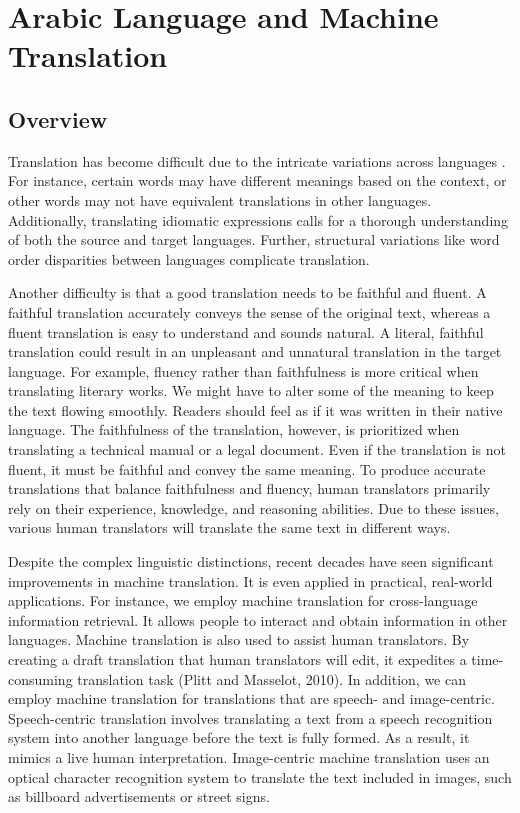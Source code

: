 \chapter{Arabic Language and Machine Translation}
\pagestyle{fancy}
\pagestyle{fancy}\chead{} \pagestyle{fancy}\rhead{}
\pagestyle{fancy} 
\pagestyle{fancy}\cfoot{} \pagestyle{fancy}\rfoot{\thepage}
\section{Overview} \label{start2}
Translation has become difficult due to the intricate variations across languages \cite{dorr99}. For instance, certain words may have different meanings based on the context, or other words may not have equivalent translations in other languages. Additionally, translating idiomatic expressions calls for a thorough understanding of both the source and target languages. Further, structural variations like word order disparities between languages complicate translation.

Another difficulty is that a good translation needs to be faithful and fluent. A faithful translation accurately conveys the sense of the original text, whereas a fluent translation is easy to understand and sounds natural. A literal, faithful translation could result in an unpleasant and unnatural translation in the target language. For example, fluency rather than faithfulness is more critical when translating literary works. We might have to alter some of the meaning to keep the text flowing smoothly. Readers should feel as if it was written in their native language. The faithfulness of the translation, however, is prioritized when translating a technical manual or a legal document. Even if the translation is not fluent, it must be faithful and convey the same meaning. To produce accurate translations that balance faithfulness and fluency, human translators primarily rely on their experience, knowledge, and reasoning abilities. Due to these issues, various human translators will translate the same text in different ways.

Despite the complex linguistic distinctions, recent decades have seen significant improvements in machine translation. It is even applied in practical, real-world applications. For instance, we employ machine translation for cross-language information retrieval. It allows people to interact and obtain information in other languages.
Machine translation is also used to assist human translators. By creating a draft translation that human translators will edit, it expedites a time-consuming translation task (Plitt and Masselot, 2010). In addition, we can employ machine translation for translations that are speech- and image-centric. Speech-centric translation involves translating a text from a speech recognition system into another language before the text is fully formed. As a result, it mimics a live human interpretation.
Image-centric machine translation uses an optical character recognition system to translate the text included in images, such as billboard advertisements or street signs.

